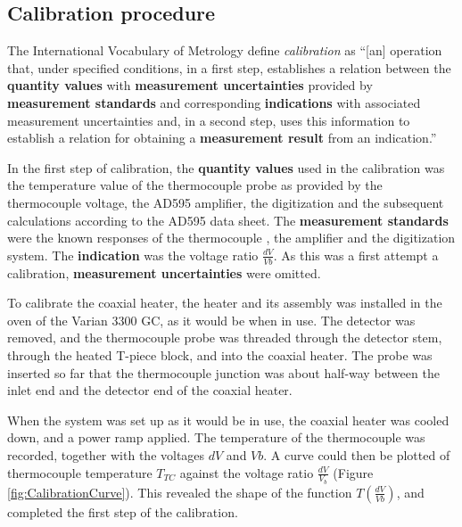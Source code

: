 \subsection{Calibration procedure}

The International Vocabulary of Metrology \autocite{JCGM200:2012} define
\textit{calibration} as ``[an] operation that, under specified conditions, in a
first step, establishes a relation between the \textbf{quantity values} with
\textbf{measurement uncertainties} provided by \textbf{measurement standards}
and corresponding \textbf{indications} with associated measurement uncertainties
and, in a second step, uses this information to establish a relation for
obtaining a \textbf{measurement result} from an indication.''

In the first step of calibration, the \textbf{quantity values} used in the
calibration was the temperature value of the thermocouple probe as provided by
the thermocouple voltage, the AD595 amplifier, the digitization and the
subsequent calculations according to the AD595 data sheet. The
\textbf{measurement standards} were the known responses of the thermocouple
\autocite{Ripple1995}, the amplifier and the digitization system. The
\textbf{indication} was the voltage ratio \(\frac{dV}{Vb}\). As this was a first
attempt a calibration, \textbf{measurement uncertainties} were omitted.

To calibrate the coaxial heater, the heater and its assembly was installed in
the oven of the Varian 3300 GC, as it would be when in use. The detector was
removed, and the thermocouple probe was threaded through the detector stem,
through the heated T-piece block, and into the coaxial heater. The probe was
inserted so far that the thermocouple junction was about half-way between the
inlet end and the detector end of the coaxial heater.

When the system was set up as it would be in use, the coaxial heater was cooled
down, and a power ramp applied. The temperature of the thermocouple was
recorded, together with the voltages \(dV\) and \(Vb\). A curve could then be
plotted of thermocouple temperature \(T_{TC}\) against the voltage ratio \(
\frac{dV}{V_b} \) (Figure \ref{fig:CalibrationCurve}). This revealed the shape of
the function \(T(\frac{dV}{Vb})\), and completed the first step of the
calibration.

